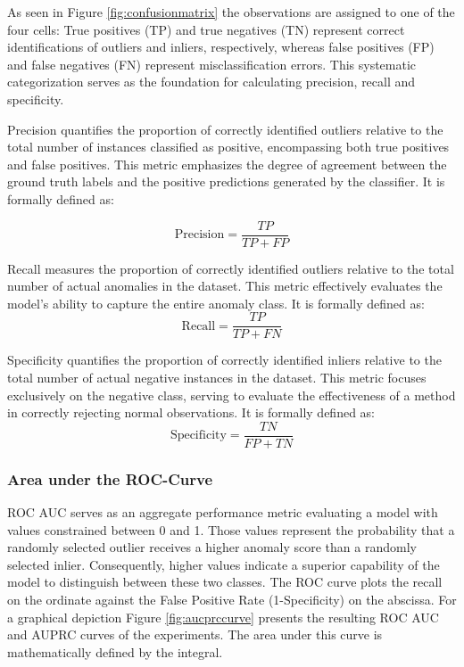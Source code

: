 As seen in Figure \ref{fig:confusionmatrix} the observations are assigned to one of the four cells: True positives (TP) and true negatives (TN) represent correct identifications of outliers and inliers, respectively, whereas false positives (FP) and false negatives (FN) represent misclassification errors. 
This systematic categorization serves as the foundation for calculating precision, recall and specificity.


Precision quantifies the proportion of correctly identified outliers relative to the total number of instances classified as positive, encompassing both true positives and false positives. 
This metric emphasizes the degree of agreement between the ground truth labels and the positive predictions generated by the classifier. 
It is formally defined as:

\begin{equation}
        \text{Precision} = \frac{TP}{TP + FP}
\end{equation}


Recall measures the proportion of correctly identified outliers relative to the total number of actual anomalies in the dataset. 
This metric effectively evaluates the model's ability to capture the entire anomaly class. 
It is formally defined as:
\begin{equation}
        \text{Recall} = \frac{TP}{TP + FN}
\end{equation}


Specificity quantifies the proportion of correctly identified inliers relative to the total number of actual negative instances in the dataset. 
\newpage
This metric focuses exclusively on the negative class, serving to evaluate the effectiveness of a method in correctly rejecting normal observations. 
It is formally defined as:
\begin{equation}
        \text{Specificity} = \frac{TN}{FP + TN}
\end{equation}


\subsubsection*{Area under the ROC-Curve}
ROC AUC serves as an aggregate performance metric evaluating a model with values constrained between 0 and 1. 
Those values represent the probability that a randomly selected outlier receives a higher anomaly score than a randomly selected inlier.
Consequently, higher values indicate a superior capability of the model to distinguish between these two classes. 
The ROC curve plots the recall on the ordinate against the False Positive Rate (1-Specificity) on the abscissa.
For a graphical depiction Figure \ref{fig:aucprccurve} presents the resulting ROC AUC and AUPRC curves of the experiments.
The area under this curve is mathematically defined by the integral.


